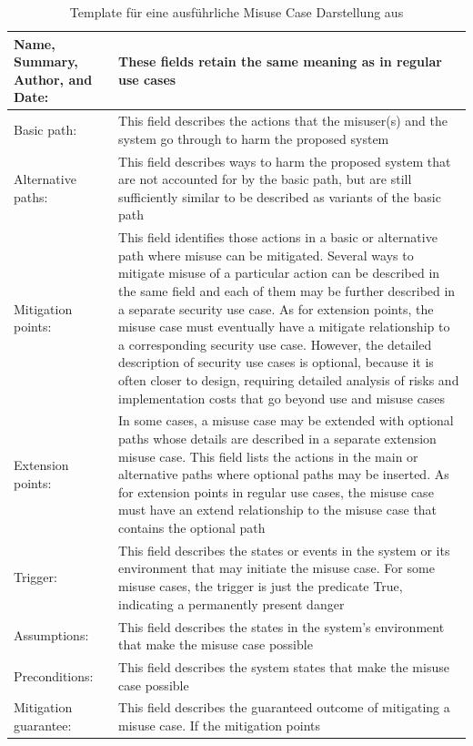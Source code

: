 \begin{table}
\scriptsize
\centering
\caption{Template für eine ausführliche Misuse Case Darstellung aus \cite{sindre2005eliciting}}
\label{tab:MisuseCaseTemplate}
\begin{tabular}{p{}p{}}
\hline 
Name, Summary, Author,
and Date: & These fields retain the same meaning as in regular use cases \\ 
\hline 
Basic path: & This field describes the actions that the misuser(s) and the system go through to harm the
proposed system \\ 
\hline 
Alternative paths: & This field describes ways to harm the proposed system that are not accounted for by the basic path,
but are still sufficiently similar to be described as variants of the basic path \\ 
\hline 
Mitigation points: & This field identifies those actions in a basic or alternative path where misuse can be mitigated.
Several ways to mitigate misuse of a particular action can be described in the same field and
each of them may be further described in a separate security use case. As for extension
points, the misuse case must eventually have a mitigate relationship to a corresponding
security use case. However, the detailed description of security use cases is optional, because
it is often closer to design, requiring detailed analysis of risks and implementation
costs that go beyond use and misuse cases \\ 
\hline 
Extension points: & In some cases, a misuse case may be extended with optional paths whose details are described
in a separate extension misuse case. This field lists the actions in the main or alternative paths
where optional paths may be inserted. As for extension points in regular use cases, the misuse
case must have an extend relationship to the misuse case that contains the optional path \\ 
\hline 
Trigger: & This field describes the states or events in the system or its environment that may initiate the
misuse case. For some misuse cases, the trigger is just the predicate True, indicating
a permanently present danger \\ 
\hline 
Assumptions: & This field describes the states in the system’s environment that make the misuse case possible \\ 
\hline 
Preconditions: & This field describes the system states that make the misuse case possible \\ 
\hline 
Mitigation guarantee: & This field describes the guaranteed outcome of mitigating a misuse case. If the mitigation points

\end{tabular}
\end{table}
